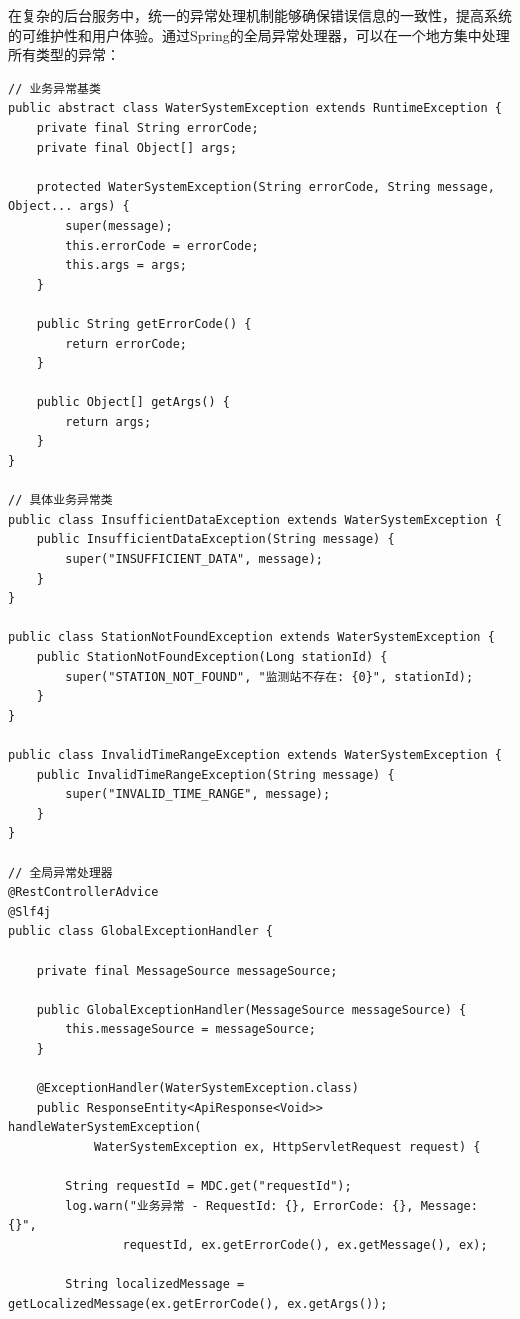 在复杂的后台服务中，统一的异常处理机制能够确保错误信息的一致性，提高系统的可维护性和用户体验。通过Spring的全局异常处理器，可以在一个地方集中处理所有类型的异常：

\begin{lstlisting}[style=java]
// 业务异常基类
public abstract class WaterSystemException extends RuntimeException {
    private final String errorCode;
    private final Object[] args;
    
    protected WaterSystemException(String errorCode, String message, Object... args) {
        super(message);
        this.errorCode = errorCode;
        this.args = args;
    }
    
    public String getErrorCode() {
        return errorCode;
    }
    
    public Object[] getArgs() {
        return args;
    }
}

// 具体业务异常类
public class InsufficientDataException extends WaterSystemException {
    public InsufficientDataException(String message) {
        super("INSUFFICIENT_DATA", message);
    }
}

public class StationNotFoundException extends WaterSystemException {
    public StationNotFoundException(Long stationId) {
        super("STATION_NOT_FOUND", "监测站不存在: {0}", stationId);
    }
}

public class InvalidTimeRangeException extends WaterSystemException {
    public InvalidTimeRangeException(String message) {
        super("INVALID_TIME_RANGE", message);
    }
}

// 全局异常处理器
@RestControllerAdvice
@Slf4j
public class GlobalExceptionHandler {
    
    private final MessageSource messageSource;
    
    public GlobalExceptionHandler(MessageSource messageSource) {
        this.messageSource = messageSource;
    }
    
    @ExceptionHandler(WaterSystemException.class)
    public ResponseEntity<ApiResponse<Void>> handleWaterSystemException(
            WaterSystemException ex, HttpServletRequest request) {
        
        String requestId = MDC.get("requestId");
        log.warn("业务异常 - RequestId: {}, ErrorCode: {}, Message: {}", 
                requestId, ex.getErrorCode(), ex.getMessage(), ex);
        
        String localizedMessage = getLocalizedMessage(ex.getErrorCode(), ex.getArgs());
        

\end{lstlisting}
